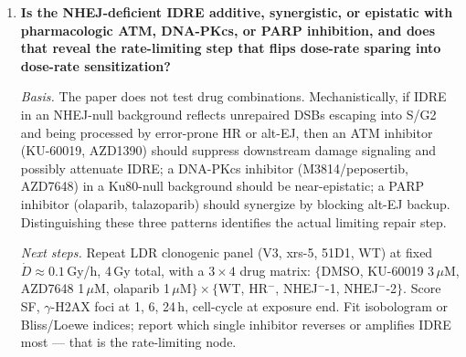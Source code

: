 \begin{enumerate}
  \emph{Basis.} CHO cells (including AA8-derived V3, xrs-5, xrs-6, 51D1) are permanently
  aneuploid with attenuated p53 and altered G1/S checkpoint responses. Every one of the
  $>$40-year-old xrs/irs/V3 lines was selected under acute high-dose-rate stress, potentially
  co-selecting for compensatory phenotypes that shape their LDR response. Whether the same
  DNA-PKcs, Ku80, or XRCC4 loss in a diploid, p53-competent, checkpoint-intact human iPSC
  gives the same IDRE is not established in the Buglewicz 2024 paper or its Kato-lab
  companions.

  \emph{Next steps.} Generate isogenic $PRKDC^{-/-}$, $XRCC6^{-/-}$ (Ku70), $XRCC5^{-/-}$
  (Ku80), and $XRCC4^{-/-}$ knockouts in a diploid iPSC line (WTC-11 or KOLF2.1J) using
  validated CRISPR guides + HDR of a stop cassette. Differentiate into a proliferating
  epithelial or neural-progenitor state to match the CHO cycling context. Repeat
  clonogenic-equivalent (self-renewal or CFU) LDR survival at matched $(D, \dot D)$ grid.
  Directly compare IDRE magnitude and $\dot D_{\rm sat}$ to the CHO panel; publish either
  confirmation (raises translational confidence) or negative result (bounds the CHO-specific
  caveat).

\item \textbf{Is the NHEJ-deficient IDRE additive, synergistic, or epistatic with pharmacologic
  ATM, DNA-PKcs, or PARP inhibition, and does that reveal the rate-limiting step that flips
  dose-rate sparing into dose-rate sensitization?}

  \emph{Basis.} The paper does not test drug combinations. Mechanistically, if IDRE in an
  NHEJ-null background reflects unrepaired DSBs escaping into S/G2 and being processed by
  error-prone HR or alt-EJ, then an ATM inhibitor (KU-60019, AZD1390) should suppress
  downstream damage signaling and possibly attenuate IDRE; a DNA-PKcs inhibitor
  (M3814/peposertib, AZD7648) in a Ku80-null background should be near-epistatic; a PARP
  inhibitor (olaparib, talazoparib) should synergize by blocking alt-EJ backup. Distinguishing
  these three patterns identifies the actual limiting repair step.

  \emph{Next steps.} Repeat LDR clonogenic panel (V3, xrs-5, 51D1, WT) at fixed $\dot
  D\approx0.1$\,Gy/h, 4\,Gy total, with a $3\times4$ drug matrix:
  $\{$DMSO, KU-60019 3\,$\mu$M, AZD7648 1\,$\mu$M, olaparib 1\,$\mu$M$\}\times\{$WT,
  HR$^-$, NHEJ$^-$-1, NHEJ$^-$-2$\}$. Score SF, $\gamma$-H2AX foci at 1, 6, 24\,h, cell-cycle
  at exposure end. Fit isobologram or Bliss/Loewe indices; report which single inhibitor
  reverses or amplifies IDRE most --- that is the rate-limiting node.


\end{enumerate}
